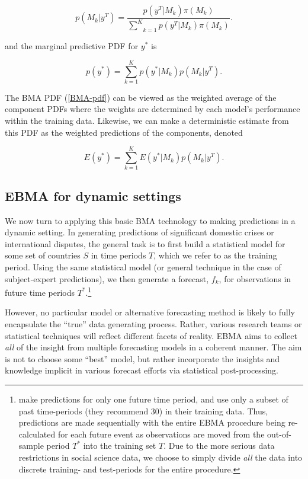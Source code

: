 \documentclass[pdftex,12pt,fullpage,oneside]{amsart}
\begin{document}
\begin{equation} 
p(M_k|y^T) = \frac{p(y^T|M_k)\pi(M_k)}{\underset{k=1}{\overset{K}{\sum}}p(y^T|M_k)\pi(M_k)}.
\end{equation}

\noindent and the marginal predictive PDF for $y^*$ is

\begin{equation}
\label{BMA-pdf}
p(y^*) = \underset{k=1}{\overset{K}{\sum}} p(y^*|M_k)p(M_k|y^T).\end{equation}

The BMA PDF (\ref{BMA-pdf}) can be viewed as the weighted average of
the component PDFs where the weights are determined by each model's
performance within the training data.  Likewise, we can make a
deterministic estimate from this PDF as the weighted predictions of
the components, denoted

\begin{equation}
E(y^*) = \underset{k=1}{\overset{K}{\sum}} E(y^*|M_k)p(M_k|y^T).\end{equation}

\subsection{EBMA for dynamic settings}

We now turn to applying this basic BMA technology to making
predictions in a dynamic setting.  In generating predictions of
significant domestic crises or international disputes, the general
task is to first build a statistical model for some set of countries
$S$ in time periods $T$, which we refer to as the training period.
Using the same statistical model (or general technique in the case of
subject-expert predictions), we then generate a forecast, $f_k$, for
observations in future time periods
$T^*$.\footnote{\citet{Sloughter:2007} make predictions for only one
  future time period, and use only a subset of past time-periods (they
  recommend 30) in their training data. Thus, predictions are
  made sequentially with the entire EBMA procedure being re-calculated
  for each future event as observations are moved from the
  out-of-sample period $T^*$ into the training set $T$. Due to the
  more serious data restrictions in social science data, we choose to
  simply divide \textit{all} the data into discrete training- and
  test-periods for the entire procedure.}

However, no particular model or alternative forecasting method is
likely to fully encapsulate the ``true'' data generating process.
Rather, various research teams or statistical techniques will reflect
different facets of reality. EBMA aims to collect \textit{all} of the
insight from multiple forecasting models in a coherent manner.  The
aim is not to choose some ``best'' model, but rather incorporate
the insights and knowledge implicit in various forecast efforts via
statistical post-processing.
\end{document}
